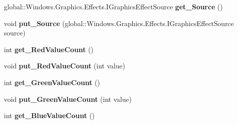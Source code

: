\begin{DoxyCompactItemize}
\item 
\mbox{\label{interface_microsoft_1_1_graphics_1_1_canvas_1_1_effects_1_1_i_posterize_effect_ad8560a10045dace88399b7e9cfa15ee8}} 
global\+::\+Windows.\+Graphics.\+Effects.\+I\+Graphics\+Effect\+Source {\bfseries get\+\_\+\+Source} ()
\item 
\mbox{\label{interface_microsoft_1_1_graphics_1_1_canvas_1_1_effects_1_1_i_posterize_effect_a543f2c579f0144304e21973d15de997a}} 
void {\bfseries put\+\_\+\+Source} (global\+::\+Windows.\+Graphics.\+Effects.\+I\+Graphics\+Effect\+Source source)
\item 
\mbox{\label{interface_microsoft_1_1_graphics_1_1_canvas_1_1_effects_1_1_i_posterize_effect_a5260ca6c96d8f98738514377bc0e68fd}} 
int {\bfseries get\+\_\+\+Red\+Value\+Count} ()
\item 
\mbox{\label{interface_microsoft_1_1_graphics_1_1_canvas_1_1_effects_1_1_i_posterize_effect_a265ff7db0fe2c42877b0078b06751fce}} 
void {\bfseries put\+\_\+\+Red\+Value\+Count} (int value)
\item 
\mbox{\label{interface_microsoft_1_1_graphics_1_1_canvas_1_1_effects_1_1_i_posterize_effect_acd9942aba27fe9a434f9fa185bff2fa1}} 
int {\bfseries get\+\_\+\+Green\+Value\+Count} ()
\item 
\mbox{\label{interface_microsoft_1_1_graphics_1_1_canvas_1_1_effects_1_1_i_posterize_effect_ac09d8d848260691f6e42b706aa4e2497}} 
void {\bfseries put\+\_\+\+Green\+Value\+Count} (int value)
\item 
\mbox{\label{interface_microsoft_1_1_graphics_1_1_canvas_1_1_effects_1_1_i_posterize_effect_a2b8b4bb5ea06b55ec3fcbc262748c566}} 
int {\bfseries get\+\_\+\+Blue\+Value\+Count} ()
\item 

\end{DoxyCompactItemize}
